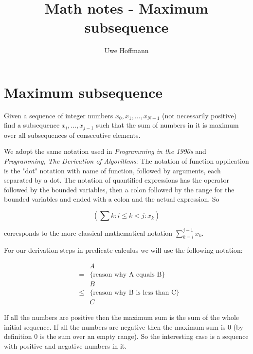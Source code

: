 

\title{Math notes - Maximum subsequence}
\author{Uwe Hoffmann}



\setcounter{chapter}{1}
\section*{Maximum subsequence}

\vspace{10 mm}
\begin{problem}
Given a sequence  of integer numbers $x_0, x_1, \dots, x_{N-1}$ (not necessarily positive) find a subsequence $x_i,\dots,x_{j - 1}$ such that the sum of numbers in it is maximum over all subsequences of consecutive elements.
\end{problem}

We adopt the same notation used in \textit{Programming in the 1990s} \cite{Cohen90} and \textit{Programming, The Derivation of Algorithms}\cite{Kaldewaij90}: The notation of function application is the "dot" notation with name of function, followed by arguments, each separated by a dot. The notation of quantified expressions has the operator followed by the bounded variables, then a colon followed by the range for the bounded variables and ended with a colon and the actual expression. So

\begin{equation*}	 
	(\sum k : i \leq k < j : x_k)
\end{equation*}

\noindent corresponds to the more classical mathematical notation $\sum_{k = i}^{ j - 1}x_k$. 

\noindent For our derivation steps in predicate calculus we will use the following notation:

\begin{equation*}
\begin{array}{lcl}
		&&A \\
	      &=& \{  \mbox{reason why A equals B} \} \\      
                  &&B \\
                &\leq& \{ \mbox{reason why B is less than C} \} \\
                  && C  
   \end{array}
\end{equation*}

If all the numbers are positive then the maximum sum is the sum of the whole initial sequence. If all the numbers are negative then the maximum sum is 0 (by definition 0 is the sum over an empty range). So the interesting case is a sequence with positive and negative numbers in it.

